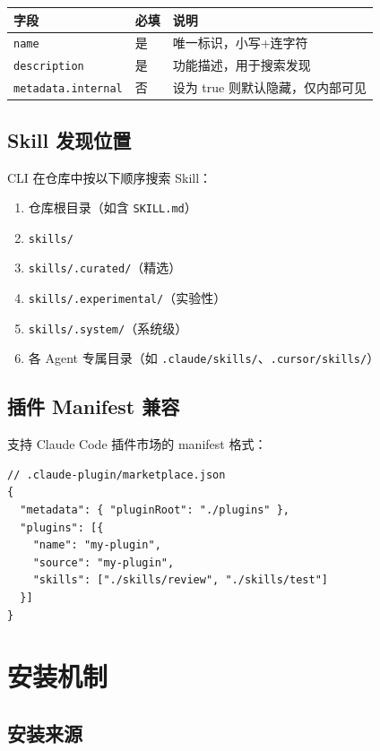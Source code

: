 \documentclass[11pt,a4paper]{article}
\begin{document}
\begin{table}[h]
\centering
\begin{tabularx}{\linewidth}{llX}
\toprule
\textbf{字段} & \textbf{必填} & \textbf{说明} \\
\midrule
\texttt{name} & 是 & 唯一标识，小写+连字符 \\
\texttt{description} & 是 & 功能描述，用于搜索发现 \\
\texttt{metadata.internal} & 否 & 设为 true 则默认隐藏，仅内部可见 \\
\bottomrule
\end{tabularx}
\end{table}

\subsection{Skill 发现位置}

CLI 在仓库中按以下顺序搜索 Skill：

\begin{enumerate}[nosep]
  \item 仓库根目录（如含 \texttt{SKILL.md}）
  \item \texttt{skills/}
  \item \texttt{skills/.curated/}（精选）
  \item \texttt{skills/.experimental/}（实验性）
  \item \texttt{skills/.system/}（系统级）
  \item 各 Agent 专属目录（如 \texttt{.claude/skills/}、\texttt{.cursor/skills/}）
\end{enumerate}

\subsection{插件 Manifest 兼容}

支持 Claude Code 插件市场的 manifest 格式：

\begin{verbatim}
// .claude-plugin/marketplace.json
{
  "metadata": { "pluginRoot": "./plugins" },
  "plugins": [{
    "name": "my-plugin",
    "source": "my-plugin",
    "skills": ["./skills/review", "./skills/test"]
  }]
}
\end{verbatim}

\section{安装机制}

\subsection{安装来源}
\end{document}
